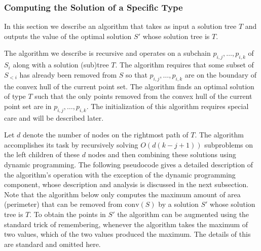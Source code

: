 \documentclass{elsart}
\newcommand{\ch}{\mathrm{conv}}
\begin{document}


\subsubsection{Computing the Solution of a Specific Type}

In this section we describe an algorithm that takes as input a
solution tree $T$ and outputs the value of the optimal solution $S'$
whose solution tree is $T$.

The algorithm we describe is recursive and operates on a subchain
$p_{i,j},\ldots,p_{i,k}$ of $S_i$ along with a solution (sub)tree $T$.  The
algorithm requires that some subset of $S_{<i}$ has
already been removed from $S$ so that $p_{i,j},\ldots,p_{i,k}$ are on
the boundary of the convex hull of the current point set.  The
algorithm finds an optimal solution of type $T$ such that the only
points removed from the convex hull of the current point set are in
$p_{i,j},\ldots,p_{i,k}$.  The initialization of this algorithm
requires special care and will be described later.

Let $d$ denote the number of nodes on the rightmost path of $T$.  The
algorithm accomplishes its task by recursively solving $O(d(k-j+1))$
subproblems on the left children of these $d$ nodes and then combining
these solutions using dynamic programming.  The following pseudocode
gives a detailed description of the algorithm's operation with the
exception of the dynamic programming component, whose description and
analysis is discussed in the next subsection.  Note that the algorithm
below only computes the maximum amount of area (perimeter) that can be
removed from $\ch(S)$ by a solution $S'$ whose solution tree is $T$.  To
obtain the points in $S'$ the algorithm can be augmented using
the standard trick of remembering, whenever the algorithm takes the
maximum of two values, which of the two values produced the maximum.
The details of this are standard and omitted here.
\end{document}
